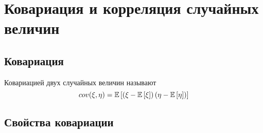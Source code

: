 \documentclass[a4paper, 10pt]{article}
\begin{document}
\newpage
\section{Ковариация и корреляция случайных величин}
\subsection{Ковариация}
 Ковариацией двух случайных величин называют 
\begin{equation*}
    cov(\xi,\eta)=\mathbb{E}\left[\left(\xi-\mathbb{E}\left[\xi\right]\right)\left(\eta-\mathbb{E}\left[\eta\right]\right)\right]
\end{equation*}

\subsection{Свойства ковариации}
\end{document}
